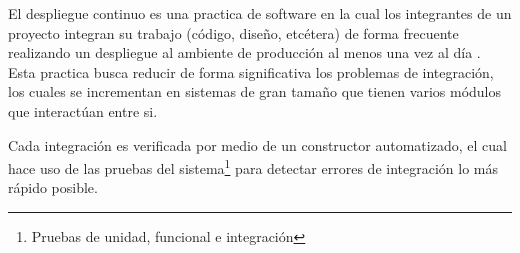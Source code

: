 El despliegue continuo es una practica de software en la cual los integrantes
de un proyecto integran su trabajo (código, diseño, etcétera) de forma frecuente
realizando un despliegue al ambiente de producción al menos una vez al día
\cite{26_martin_fowler_ci}. Esta practica busca reducir de forma significativa los
problemas de integración, los cuales se incrementan en sistemas de gran tamaño
que tienen varios módulos que interactúan entre si.

Cada integración es verificada por medio de un constructor automatizado, el cual
hace uso de las pruebas del sistema\footnote{Pruebas de unidad, funcional e
  integración} para detectar errores de integración lo más rápido posible.
